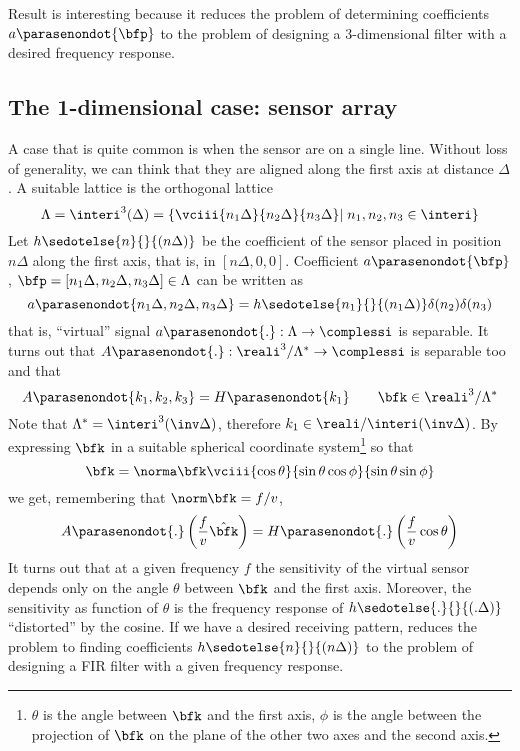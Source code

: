 \documentclass[11pt]{article}
\newcommand{\wv}{\bfk}
\newcommand{\wvn}{\hat\wv}
\newcommand{\x}[1][0]{\ifcase #1\bfp \or\bfq\else x#1\fi}
\newcommand{\coeff}[1][\x]{a\parasenondot{#1}}
\newcommand{\Coeff}[1][\wv]{A\parasenondot{#1}}
\newcommand{\lcoeff}[1]{h\sedotelse{#1}{}{({#1}\Delta)}}
\newcommand{\Lcoeff}[1]{H\parasenondot{#1}}
\begin{document}
Result  is interesting because it reduces
the problem of determining coefficients $\coeff$ to the problem of
designing a 3-dimensional filter with a desired frequency response.

\subsection{The 1-dimensional case: sensor array}
\label{sub:1.0;beamforming-notes}

A case that is quite common is when the sensor are on a single line.
Without loss of generality, we can think that they are aligned along
the first axis at distance $\Delta$.  A suitable lattice is the
orthogonal lattice
%
\begin{equation}
\label{eq:12;beamforming-notes}
\Lambda=\interi^3(\Delta) = \left\{\vciii{n_1\Delta}{ n_2\Delta}{
  n_3\Delta} |  \; n_1,
n_2, n_3 \in \interi\right\}
\end{equation}
%
Let
$\lcoeff n$ be the coefficient of the sensor placed in position
$n\Delta$ along the first axis, that is, in $[n\Delta, 0,
  0]$. Coefficient $\coeff$, $\x=[ n_1\Delta, n_2\Delta, n_3\Delta]
\in \Lambda$ can be written as
%
\begin{equation}
\label{eq:7;beamforming-notes}
\coeff[n_1\Delta, n_2\Delta, n_3\Delta] = \lcoeff{n_1} \delta(n_2) \delta(n_3)
\end{equation}
%
that is, ``virtual'' signal $\coeff[.] : \Lambda \to \complessi$ is
separable.  It turns out that $\Coeff[.] :
\reali^3/\Lambda^*\to\complessi$ is 
separable too and that 
%
\begin{equation}
\label{eq:8;beamforming-notes}
\Coeff[k_1, k_2, k_3] = \Lcoeff{k_1}
\qquad \wv \in \reali^3/\Lambda^*
\end{equation}
%
Note that $\Lambda^*=\interi^3(\inv\Delta)$, therefore $k_1 \in
\reali/\interi(\inv\Delta)$. By expressing $\wv$ in a suitable spherical
coordinate system\footnote{$\theta$ is the angle between $\wv$ and the
  first axis, $\phi$ is the angle between the projection of $\wv$ on
  the plane of the other two axes and the second axis.}
  so that
%
\begin{equation}
\label{eq:10;beamforming-notes}
\wv=\norma\wv \vciii{\cos\theta}
  {\sin\theta\cos\phi}{\sin\theta\sin\phi}
\end{equation}
%
we get, remembering that $\norm\wv=f/v$,
%
\begin{equation}
\label{eq:9;beamforming-notes}
\Coeff[.]\left(\frac{f}{v}\wvn \right)
= \Lcoeff.\left(\frac{f}{v}\cos\theta \right)
\end{equation}
%
It turns out that at a given frequency $f$ the sensitivity of the
virtual sensor depends only on the angle $\theta$ between $\wv$ and
the first axis. Moreover, the sensitivity as function of $\theta$ is
the frequency response of $\lcoeff.$ ``distorted'' by the cosine. If
we have a desired receiving pattern, 
reduces the problem to finding coefficients $\lcoeff n$ to the problem
of designing a FIR filter with a given frequency response.
\end{document}
